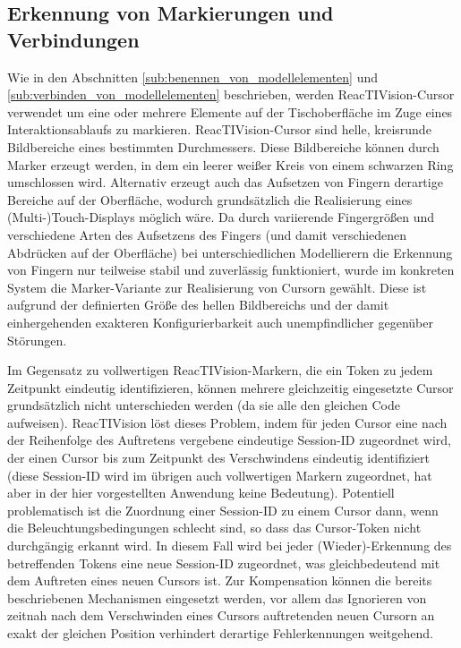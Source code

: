 
\subsection{Erkennung von Markierungen und Verbindungen} %
\label{sub:erkennen_von_verbindungen}

Wie in den Abschnitten \ref{sub:benennen_von_modellelementen} und \ref{sub:verbinden_von_modellelementen} beschrieben, werden ReacTIVision-Cursor verwendet um eine oder mehrere Elemente auf der Tischoberfläche im Zuge eines Interaktionsablaufs zu markieren. ReacTIVision-Cursor sind helle, kreisrunde Bildbereiche eines bestimmten Durchmessers. Diese Bildbereiche können durch Marker erzeugt werden, in dem ein leerer weißer Kreis von einem schwarzen Ring umschlossen wird. Alternativ erzeugt auch das Aufsetzen von Fingern derartige Bereiche auf der Oberfläche, wodurch grundsätzlich die Realisierung eines (Multi-)Touch-Displays möglich wäre. Da durch variierende Fingergrößen und verschiedene Arten des Aufsetzens des Fingers (und damit verschiedenen Abdrücken auf der Oberfläche) bei unterschiedlichen Modellierern die Erkennung von Fingern nur teilweise stabil und zuverlässig funktioniert, wurde im konkreten System die Marker-Variante zur Realisierung von Cursorn gewählt. Diese ist aufgrund der definierten Größe des hellen Bildbereichs und der damit einhergehenden exakteren Konfigurierbarkeit auch unempfindlicher gegenüber Störungen.

Im Gegensatz zu vollwertigen ReacTIVision-Markern, die ein Token zu jedem Zeitpunkt eindeutig identifizieren, können mehrere gleichzeitig eingesetzte Cursor grundsätzlich nicht unterschieden werden (da sie alle den gleichen Code aufweisen). ReacTIVision löst dieses Problem, indem für jeden Cursor eine nach der Reihenfolge des Auftretens vergebene eindeutige Session-ID zugeordnet wird, der einen Cursor bis zum Zeitpunkt des Verschwindens eindeutig identifiziert (diese Session-ID wird im übrigen auch vollwertigen Markern zugeordnet, hat aber in der hier vorgestellten Anwendung keine Bedeutung). Potentiell problematisch ist die Zuordnung einer Session-ID zu einem Cursor dann, wenn die Beleuchtungsbedingungen schlecht sind, so dass das Cursor-Token nicht durchgängig erkannt wird. In diesem Fall wird bei jeder (Wieder)-Erkennung des betreffenden Tokens eine neue Session-ID zugeordnet, was gleichbedeutend mit dem Auftreten eines neuen Cursors ist. Zur Kompensation können die bereits beschriebenen Mechanismen eingesetzt werden, vor allem das Ignorieren von zeitnah nach dem Verschwinden eines Cursors auftretenden neuen Cursorn an exakt der gleichen Position verhindert derartige Fehlerkennungen weitgehend.

